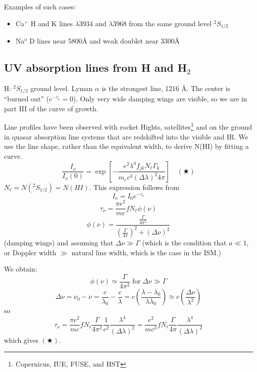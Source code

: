 \documentclass[11pt]{article}
\newcommand{\mar}[1]{\hspace{0pt}\marginpar{-\textcolor{black}{#1}-}}
\begin{document}
Examples of such cases:
\begin{itemize}
    \item Ca$^{+}$ H and K lines $\lambda$3934 and $\lambda$3968 from the
        same ground level $^{2}S_{1/2}$
    \item Na$^{o}$ D lines near 5800\AA{} and weak doublet near 3300\AA{}
\end{itemize}

\subsection{UV absorption lines from H and H$_{2}$}
\mar{96}
H: $^{2}S_{1/2}$ ground level. Lyman $\alpha$ is the strongest line,
1216 \AA{}. The center is ``burned out'' ($e^{-\tau_{\nu}} = 0$).
Only very wide damping wings are visible, so we are in part III of the
curve of growth.

Line profiles have been observed with rocket Hights, satellites\footnote{
    Copernicus, IUE, FUSE, and HST}
and on the ground in quasar absorption line systems that are redshifted into
the visible and IR. We use the line shape, rather than the equivalent width,
to derive N(HI) by fitting a curve.
\[
    \frac{I_{\nu}}{I_{\nu}(0)}
    = \exp \left[ -\frac{e^{2}\lambda^{4}f_{jk}N_{\ell} \Gamma_{k}}
    {m_{e} c^{3} \left( \Delta\lambda  \right)^{2} 4\pi}
        \right] \quad (\bigstar)
    \]
$N_{\ell} = N(^{2}S_{1/2}) = N(HI)$. This expression follows from
\[
    I_{\nu} = I_{0} e^{-\tau_{\nu}}
    \]
\[
    \tau_{\nu} = \frac{\pi e^{2}}{mc} f N_{\ell} \phi(\nu)
    \]
\[
    \phi(\nu) = \frac{ \frac{\Gamma}{4\pi^{2}} }
    {\left( \frac{\Gamma}{4\pi} \right)^{2} + \left( \Delta\nu \right)^{2}}
    \]
(damping wings) and assuming that $\Delta\nu \gg \Gamma$ (which is the
condition that $a \ll 1$, or Doppler width $\gg$ natural line width,
which is the case in the ISM.)

\mar{97}We obtain:
\[
    \phi(\nu) \simeq \frac{\Gamma}{4\pi^{2}}\; \mathrm{for}\;
    \Delta\nu \gg \Gamma
    \]
\[
    \Delta\nu = \nu_{0} - \nu = \frac{c}{\lambda_{0}} - \frac{c}{\lambda}
    = c \left( \frac{\lambda - \lambda_{0}}{\lambda\lambda_{0}}  \right)
    \approx c \left( \frac{\Delta\nu}{\lambda^{2}} \right)
    \]
so
\[
    \tau_{\nu} = \frac{{\pi}e^{2}}{mc} f N_{\ell} \frac{\Gamma}{4\pi^{2}}
    \frac{1}{c^{2}} \frac{\lambda^{4}}{\left( \Delta\lambda \right)^{2}}
    = \frac{e^{2}}{mc^{3}} f N_{\ell} \frac{\Gamma}{4\pi}
    \frac{\lambda^{4}}{\left( \Delta\lambda \right)^{2}}
    \]
which gives $(\bigstar)$.
\end{document}
